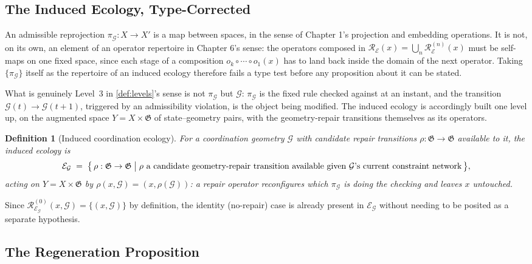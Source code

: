 \documentclass[12pt]{report}
\newtheorem{definition}{Definition}[section]
\begin{document}
\subsection{The Induced Ecology, Type-Corrected}
\label{sec:induced-ecology}

An admissible reprojection $\pi_\mathcal{G} : X \to X'$ is a map between
spaces, in the sense of Chapter 1's projection and embedding operations.
It is not, on its own, an element of an operator repertoire in Chapter
6's sense: the operators composed in $\mathcal{R}_\mathcal{E}(x) =
\bigcup_n \mathcal{R}_\mathcal{E}^{(n)}(x)$ must be self-maps on one
fixed space, since each stage of a composition $o_k \circ \cdots \circ
o_1(x)$ has to land back inside the domain of the next operator. Taking
$\{\pi_\mathcal{G}\}$ itself as the repertoire of an induced ecology
therefore fails a type test before any proposition about it can be
stated.

What is genuinely Level~3 in \cref{def:levels}'s sense is not
$\pi_\mathcal{G}$ but $\mathcal{G}$: $\pi_\mathcal{G}$ is the fixed rule
checked against at an instant, and the transition $\mathcal{G}(t) \to
\mathcal{G}(t+1)$, triggered by an admissibility violation, is the
object being modified. The induced ecology is accordingly built one
level up, on the augmented space $Y = X \times \mathfrak{G}$ of
state--geometry pairs, with the geometry-repair transitions themselves
as its operators.

\begin{definition}[Induced coordination ecology]
\label{def:coordination-ecology}
For a coordination geometry $\mathcal{G}$ with candidate repair
transitions $\rho : \mathfrak{G} \to \mathfrak{G}$ available to it, the
\emph{induced ecology} is
\[
\mathcal{E}_\mathcal{G} \;=\; \bigl\{\, \rho : \mathfrak{G} \to
\mathfrak{G} \bigm| \rho \text{ a candidate geometry-repair transition
available given } \mathcal{G}\text{'s current constraint network} \,\bigr\},
\]
acting on $Y = X \times \mathfrak{G}$ by $\rho(x,\mathcal{G}) =
(x,\rho(\mathcal{G}))$: a repair operator reconfigures which
$\pi_\mathcal{G}$ is doing the checking and leaves $x$ untouched.
\end{definition}

Since $\mathcal{R}^{(0)}_{\mathcal{E}_\mathcal{G}}(x,\mathcal{G}) =
\{(x,\mathcal{G})\}$ by definition, the identity (no-repair) case is
already present in $\mathcal{E}_\mathcal{G}$ without needing to be
posited as a separate hypothesis.

\subsection{The Regeneration Proposition}
\end{document}
